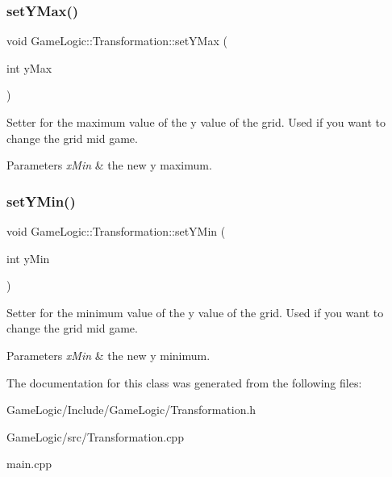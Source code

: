 \subsubsection{\texorpdfstring{set\+Y\+Max()}{setYMax()}}
{\footnotesize\ttfamily void Game\+Logic\+::\+Transformation\+::set\+Y\+Max (\begin{DoxyParamCaption}\item[{int}]{y\+Max }\end{DoxyParamCaption})}

Setter for the maximum value of the y value of the grid. Used if you want to change the grid mid game. 
\begin{DoxyParams}{Parameters}
{\em x\+Min} & the new y maximum. \\
\hline
\end{DoxyParams}
\mbox{\label{classGameLogic_1_1Transformation_a8863f56cd8d117a6817d288fa28258bd}} 
\subsubsection{\texorpdfstring{set\+Y\+Min()}{setYMin()}}
{\footnotesize\ttfamily void Game\+Logic\+::\+Transformation\+::set\+Y\+Min (\begin{DoxyParamCaption}\item[{int}]{y\+Min }\end{DoxyParamCaption})}

Setter for the minimum value of the y value of the grid. Used if you want to change the grid mid game. 
\begin{DoxyParams}{Parameters}
{\em x\+Min} & the new y minimum. \\
\hline
\end{DoxyParams}


The documentation for this class was generated from the following files\+:\begin{DoxyCompactItemize}
\item 
Game\+Logic/\+Include/\+Game\+Logic/Transformation.\+h\item 
Game\+Logic/src/Transformation.\+cpp\item 
main.\+cpp\end{DoxyCompactItemize}
